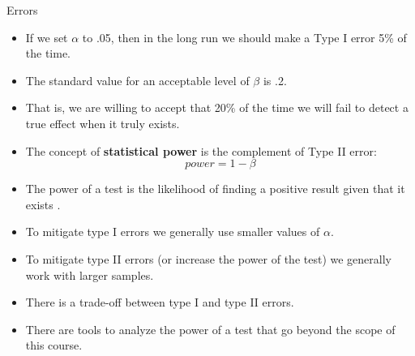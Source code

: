 \documentclass[handout]{beamer}
\begin{document}
\begin{frame}{Errors}
 \scriptsize{

\begin{itemize}
 \item If we set $\alpha$ to .05, then in the long run we should make a Type I error 5\% of the time. 
 \item The standard value for an acceptable level of $\beta$ is .2.
 \item That is, we are willing to accept that 20\% of the time we will fail to detect a true effect when it truly exists.
  \item The concept of \textbf{statistical power} is the complement of Type II error: 
  \begin{displaymath}                                                                               
 power = 1 - \beta                                                                                      \end{displaymath}

  
 \item The power of a test is the likelihood of finding a positive result given that it exists \cite{poldrack2019statistical}.
 
 \item To mitigate type I errors we generally use smaller values of $\alpha$.
 \item To mitigate type II errors (or increase the power of the test) we generally work with larger samples.
 \item There is a trade-off between type I and type II errors. 
 \item There are tools to analyze the power of a test that go beyond the scope of this course.
\end{itemize}



}
\end{frame}
\end{document}
